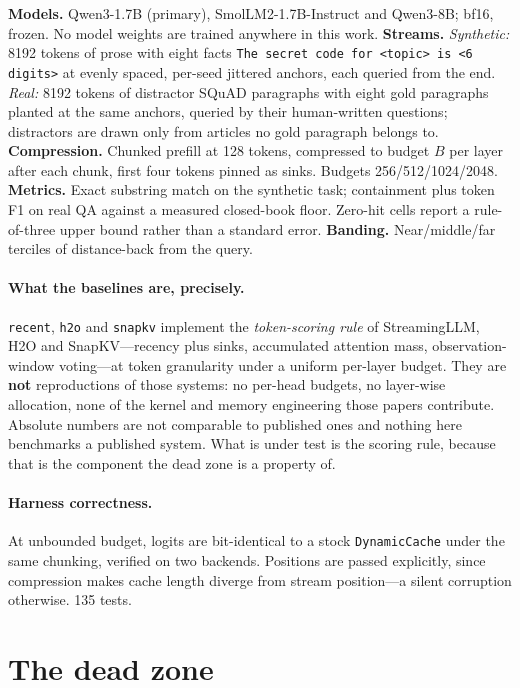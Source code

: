 \documentclass[10pt]{article}
\begin{document}
\textbf{Models.} Qwen3-1.7B (primary), SmolLM2-1.7B-Instruct and Qwen3-8B;
bf16, frozen. No model weights are trained anywhere in this work.
\textbf{Streams.} \emph{Synthetic:} 8192 tokens of prose with eight facts
\texttt{The secret code for <topic> is <6 digits>} at evenly spaced, per-seed
jittered anchors, each queried from the end. \emph{Real:} 8192 tokens of
distractor SQuAD paragraphs with eight gold paragraphs planted at the same
anchors, queried by their human-written questions; distractors are drawn only
from articles no gold paragraph belongs to.
\textbf{Compression.} Chunked prefill at 128 tokens, compressed to budget $B$
per layer after each chunk, first four tokens pinned as sinks. Budgets
256/512/1024/2048.
\textbf{Metrics.} Exact substring match on the synthetic task; containment plus
token F1 on real QA against a measured closed-book floor. Zero-hit cells report
a rule-of-three upper bound rather than a standard error.
\textbf{Banding.} Near/middle/far terciles of distance-back from the query.

\paragraph{What the baselines are, precisely.}
\texttt{recent}, \texttt{h2o} and \texttt{snapkv} implement the
\emph{token-scoring rule} of StreamingLLM, H2O and SnapKV---recency plus sinks,
accumulated attention mass, observation-window voting---at token granularity
under a uniform per-layer budget. They are \textbf{not} reproductions of those
systems: no per-head budgets, no layer-wise allocation, none of the kernel and
memory engineering those papers contribute. Absolute numbers are not comparable
to published ones and nothing here benchmarks a published system. What is under
test is the scoring rule, because that is the component the dead zone is a
property of.

\paragraph{Harness correctness.} At unbounded budget, logits are bit-identical
to a stock \texttt{DynamicCache} under the same chunking, verified on two
backends. Positions are passed explicitly, since compression makes cache length
diverge from stream position---a silent corruption otherwise. 135 tests.

\section{The dead zone}\label{sec:deadzone}
\end{document}
